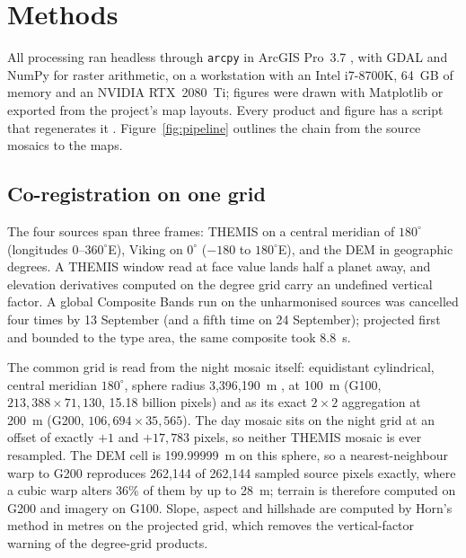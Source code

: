 \documentclass[twocolumn]{aastex701}
\begin{document}
\section{Methods} \label{sec:methods}

All processing ran headless through \texttt{arcpy} in ArcGIS Pro~3.7 \citep{ArcGISPro}, with GDAL \citep{GDAL} and
NumPy \citep{Harris2020} for raster arithmetic, on a workstation with an Intel i7-8700K, 64~GB of memory and an NVIDIA
RTX~2080~Ti; figures were drawn with Matplotlib \citep{Hunter2007} or exported from the project's map layouts. Every
product and figure has a script that regenerates it \citep{Edwards2026data}. Figure~\ref{fig:pipeline} outlines the
chain from the source mosaics to the maps. %

\subsection{Co-registration on one grid}

The four sources span three frames: THEMIS on a central meridian of $180^{\circ}$ (longitudes $0$--$360^{\circ}$E),
Viking on $0^{\circ}$ ($-180$ to $180^{\circ}$E), and the DEM in geographic degrees. A THEMIS window read at face value
lands half a planet away, and elevation derivatives computed on the degree grid carry an undefined vertical factor. A
global Composite Bands run on the unharmonised sources was cancelled four times by 13 September (and a fifth time on 24
September); projected first and bounded to the type area, the same composite took 8.8~s. %

The common grid is read from the night mosaic itself: equidistant cylindrical, central meridian $180^{\circ}$, sphere
radius 3,396,190~m \citep{Archinal2018}, at 100~m (G100, $213{,}388\times71{,}130$, 15.18 billion pixels) and as its
exact $2\times2$ aggregation at 200~m (G200, $106{,}694\times35{,}565$). The day mosaic sits on the night grid at an
offset of exactly $+1$ and $+17{,}783$ pixels, so neither THEMIS mosaic is ever resampled. The DEM cell is
199.99999~m on this sphere, so a nearest-neighbour warp to G200 reproduces 262,144 of 262,144 sampled source pixels
exactly, where a cubic warp alters 36\% of them by up to 28~m; terrain is therefore computed on G200 and imagery on
G100. Slope, aspect and hillshade are computed by Horn's method \citep{Horn1981} in metres on the projected grid, which removes the vertical-factor
warning of the degree-grid products. %
\end{document}
